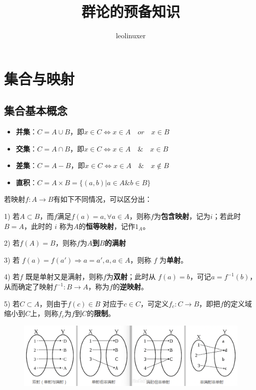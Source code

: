 \documentclass[12pt]{article}
\title{群论的预备知识\cite{From_Linear_Equation_To_Galois_Theory}}
\author{leolinuxer}
\begin{document}
\maketitle
\tableofcontents

\section{集合与映射}
\subsection{集合基本概念}
\begin{itemize}
\setlength{\itemsep}{0pt}
\setlength{\parsep}{0pt}
\setlength{\parskip}{0pt}
    \item \textbf{并集}：$C = A\cup B$，即$x\in C \Leftrightarrow x\in A \quad or \quad x \in B$
    \item \textbf{交集}：$C = A \cap B$，即$x\in C \Leftrightarrow x\in A \quad \& \quad x \in B$
    \item \textbf{差集}：$C = A - B$，即$x\in C \Leftrightarrow x\in A \quad \& \quad x \notin B$
    \item \textbf{直积}：$C = A \times B = \{(a,b)|a\in A \& b \in B\}$
\end{itemize}

若映射$f: A \rightarrow B$有如下不同情况，可以区分出：

1) 若$A \subset B$，而$f$满足$f(a) = a, \forall a \in A$，则称$f$为\textbf{包含映射}，记为$i$；若此时 $B=A$，此时的 $i$ 称为$A$的\textbf{恒等映射}，记作$1_A$。

2) 若$f(A) = B$，则称$f$为\textbf{$A$到$B$的满射}

3) 若 $f(a) = f(a') \Rightarrow a = a', a,a \in A$，则称 $f$ 为\textbf{单射}。

4) 若$f$ 既是单射又是满射，则称$f$为\textbf{双射}；此时从 $f(a) = b$，可记$a = f^{-1}(b)$，从而确定了映射$f^{-1}: B \rightarrow A$，称为$f$的\textbf{逆映射}。

5) 若$C \subset A$，则由于$f(c) \in B$ 对应于$c \in C$，可定义$f_c: C \rightarrow B$，即把$f$的定义域缩小到$C$上，则称$f_c$为$f$到$C$的\textbf{限制}。
\begin{figure}[H]
    \centering
    \includegraphics[width=.8\textwidth]{fig/SetMappingClassification.png}
\end{figure}
\end{document}
